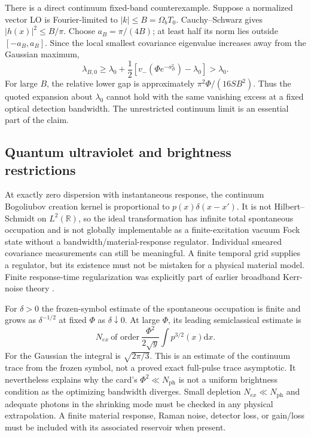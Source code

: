 \documentclass[11pt,a4paper]{article}
\newcommand{\dd}{\mathrm d}
\newcommand{\R}{\mathbb R}
\newcommand{\Nph}{N_{\mathrm{ph}}}
\newcommand{\lzero}{\lambda_0}
\begin{document}
There is a direct continuum fixed-band counterexample. Suppose a normalized vector LO is Fourier-limited to $|k|\le B=\Omega_bT_0$. Cauchy--Schwarz gives $|h(x)|^2\le B/\pi$. Choose $a_B=\pi/(4B)$; at least half its norm lies outside $[-a_B,a_B]$. Since the local smallest covariance eigenvalue increases away from the Gaussian maximum,
\begin{equation}\label{eq:bandbound}
\boxed{\lambda_{B,0}\ge\lzero+\frac12\left[v_-(\Phi e^{-a_B^2})-\lzero\right]>\lzero.}
\end{equation}
For large $B$, the relative lower gap is approximately $\pi^2\Phi/(16SB^2)$. Thus the quoted expansion about $\lzero$ cannot hold with the same vanishing excess at a fixed optical detection bandwidth. The unrestricted continuum limit is an essential part of the claim.

\subsection{Quantum ultraviolet and brightness restrictions}

At exactly zero dispersion with instantaneous response, the continuum Bogoliubov creation kernel is proportional to $p(x)\delta(x-x')$. It is not Hilbert--Schmidt on $L^2(\R)$, so the ideal transformation has infinite total spontaneous occupation and is not globally implementable as a finite-excitation vacuum Fock state without a bandwidth/material-response regulator. Individual smeared covariance measurements can still be meaningful. A finite temporal grid supplies a regulator, but its existence must not be mistaken for a physical material model. Finite response-time regularization was explicitly part of earlier broadband Kerr-noise theory \cite{joneckis}.

For $\delta>0$ the frozen-symbol estimate of the spontaneous occupation is finite and grows as $\delta^{-1/2}$ at fixed $\Phi$ as $\delta\downarrow0$. At large $\Phi$, its leading semiclassical estimate is
\begin{equation}
N_{ex}\ \text{of order}\ \frac{\Phi^2}{2\sqrt y}\int p^{3/2}(x)\dd x.
\end{equation}
For the Gaussian the integral is $\sqrt{2\pi/3}$. This is an estimate of the continuum trace from the frozen symbol, not a proved exact full-pulse trace asymptotic. It nevertheless explains why the card's $\Phi^2\ll\Nph$ is not a uniform brightness condition as the optimizing bandwidth diverges. Small depletion $N_{ex}\ll\Nph$ and adequate photons in the shrinking mode must be checked in any physical extrapolation. A finite material response, Raman noise, detector loss, or gain/loss must be included with its associated reservoir when present.
\end{document}
